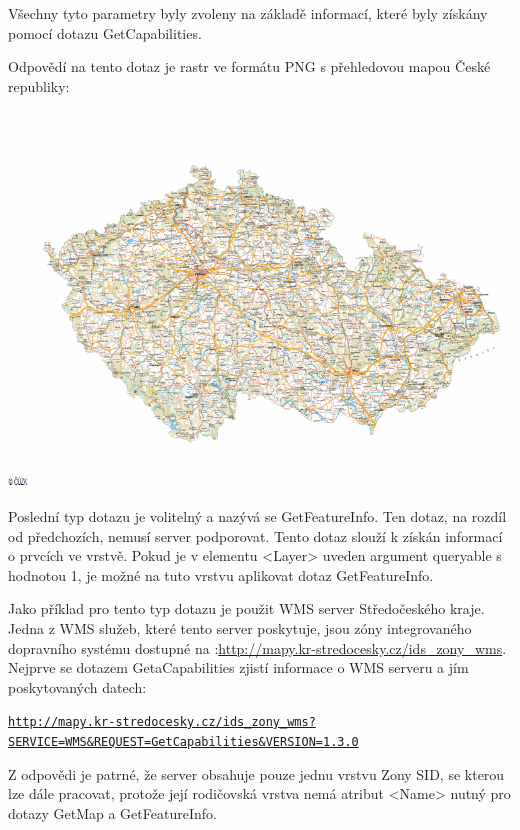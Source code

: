 \documentclass[a4paper,12pt]{article}
\begin{document}
Všechny tyto parametry byly zvoleny na základě informací, které byly získány pomocí dotazu GetCapabilities. 

Odpovědí na tento dotaz je rastr ve formátu PNG s přehledovou mapou České republiky:

 \includegraphics[scale=0.5]{figures/GetMapResponse}


Poslední typ dotazu je volitelný a nazývá se GetFeatureInfo. Ten dotaz, na rozdíl od předchozích, nemusí server podporovat.
Tento dotaz slouží k získán informací o prvcích ve vrstvě. Pokud je v elementu <Layer> uveden argument  queryable 
s hodnotou 1, je možné na tuto vrstvu aplikovat dotaz GetFeatureInfo.  

Jako příklad pro tento typ dotazu je použit WMS server Středočeského kraje. Jedna z WMS služeb, které tento server poskytuje, jsou zóny integrovaného dopravního systému dostupné
na :\url{http://mapy.kr-stredocesky.cz/ids_zony_wms}. 
Nejprve se dotazem GetaCapabilities zjistí informace o WMS serveru a jím poskytovaných datech:

\newcommand{\StredoceskygetCap}{http://mapy.kr-stredocesky.cz/ids_zony_wms?SERVICE=WMS&REQUEST=GetCapabilities}
\begin{alltt}\footnotesize
\href{\StredoceskygetCap}{http://mapy.kr-stredocesky.cz/ids\_zony\_wms?}
\href{\StredoceskygetCap}{SERVICE=WMS\&REQUEST=GetCapabilities\&VERSION=1.3.0}
\end{alltt}

Z odpovědi je patrné, že server obsahuje pouze jednu vrstvu Zony SID, se kterou lze dále pracovat, protože její rodičovská vrstva nemá atribut <Name> nutný pro dotazy GetMap a GetFeatureInfo.
\end{document}
